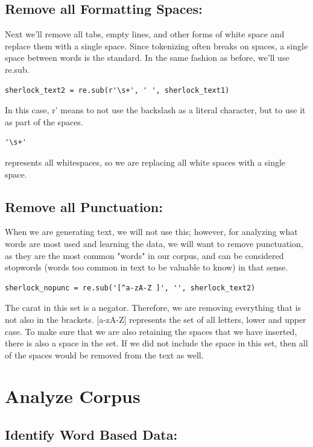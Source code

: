 \documentclass{article}
\begin{document}
\subsection{Remove all Formatting Spaces:}

Next we'll remove all tabs, empty lines, and other forms of white space and replace them with a single space. Since tokenizing often breaks on spaces, a single space between words is the standard. In the same fashion as before, we'll use re.sub.
\begin{verbatim}
sherlock_text2 = re.sub(r'\s+', ' ', sherlock_text1)
\end{verbatim}
 In this case, r' means to not use the backslash as a literal character, but to use it as part of the spaces. 
 \begin{verbatim}
'\s+'
 \end{verbatim}
 represents all whitespaces, so we are replacing all white spaces with a single space.
 
 \subsection{Remove all Punctuation:}
 
 When we are generating text, we will not use this; however, for analyzing what words are most used and learning the data, we will want to remove punctuation, as they are the most common "words" in our corpus, and can be considered stopwords (words too common in text to be valuable to know) in that sense. 
 \begin{verbatim}
sherlock_nopunc = re.sub('[^a-zA-Z ]', '', sherlock_text2)
 \end{verbatim}
 The carat in this set is a negator. Therefore, we are removing everything that is not also in the brackets. [a-zA-Z] represents the set of all letters, lower and upper case. To make sure that we are also retaining the spaces that we have inserted, there is also a space in the set. If we did not include the space in this set, then all of the spaces would be removed from the text as well. 
 
 \section{Analyze Corpus}
 

 \subsection{Identify Word Based Data:}
 
\end{document}
